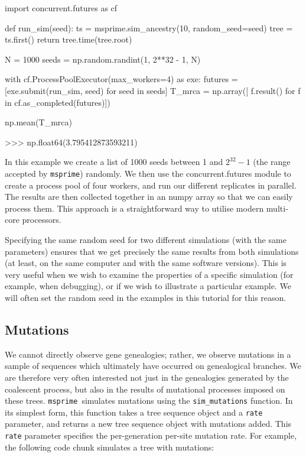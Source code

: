 \documentclass[graybox]{svmult}
\newcommand{\msprime}[0]{\texttt{msprime}}
\begin{document}
\begin{pythoncode}
import concurrent.futures as cf

def run_sim(seed):
    ts = msprime.sim_ancestry(10, random_seed=seed)
    tree = ts.first()
    return tree.time(tree.root)

N = 1000
seeds = np.random.randint(1, 2**32 - 1, N)

with cf.ProcessPoolExecutor(max_workers=4) as exe:
     futures = [exe.submit(run_sim, seed) for seed in seeds]
     T_mrca = np.array([
        f.result() for f in cf.as_completed(futures)])

np.mean(T_mrca)

>>> np.float64(3.795412873593211)
\end{pythoncode}

In this example we create a list of 1000 seeds between 1 and $2^{32} -
1$ (the range accepted by \msprime) randomly. We then use the
concurrent.futures module to create a process pool of four workers, and
run our different replicates in parallel. The results are then
collected together in an numpy array so that we can easily process them.
This approach is a straightforward way to utilise modern
multi-core processors.

Specifying the same random seed for two different simulations (with the
same parameters) ensures that we get precisely the same results from
both simulations (at least, on the same computer and with the same
software versions). This is very useful when we wish to examine the
properties of a specific simulation (for example, when debugging), or if
we wish to illustrate a particular example. We will often set the random
seed in the examples in this tutorial for this reason.

\subsection{Mutations}\label{mutations}

We cannot directly observe gene genealogies; rather, we observe mutations in a
sample of sequences which ultimately have occurred on genealogical branches. We
are therefore very often interested not just in the genealogies generated by
the coalescent process, but also in the results of mutational processes imposed
on these trees. \msprime\ simulates mutations using the \texttt{sim\_mutations}
function. In its simplest form, this function takes a tree sequence object and
a \texttt{rate} parameter, and returns a new tree sequence object with
mutations added. This \texttt{rate} parameter specifies the per-generation
per-site mutation rate. For example, the following code chunk simulates a tree
with mutations:
\end{document}
